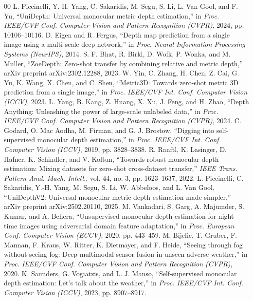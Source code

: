 \documentclass[conference]{IEEEtran}
\begin{document}
\begin{thebibliography}{00}
 L. Piccinelli, Y.-H. Yang, C. Sakaridis, M. Segu, S. Li, L. Van Gool, and F. Yu, ``UniDepth: Universal monocular metric depth estimation,'' in \emph{Proc. IEEE/CVF Conf. Computer Vision and Pattern Recognition (CVPR)}, 2024, pp. 10106--10116.
 D. Eigen and R. Fergus, ``Depth map prediction from a single image using a multi-scale deep network,'' in \emph{Proc. Neural Information Processing Systems (NeurIPS)}, 2014.
 S. F. Bhat, R. Birkl, D. Wofk, P. Wonka, and M. Muller, ``ZoeDepth: Zero-shot transfer by combining relative and metric depth,'' arXiv preprint arXiv:2302.12288, 2023.
 W. Yin, C. Zhang, H. Chen, Z. Cai, G. Yu, K. Wang, X. Chen, and C. Shen, ``Metric3D: Towards zero-shot metric 3D prediction from a single image,'' in \emph{Proc. IEEE/CVF Int. Conf. Computer Vision (ICCV)}, 2023.
 L. Yang, B. Kang, Z. Huang, X. Xu, J. Feng, and H. Zhao, ``Depth Anything: Unleashing the power of large-scale unlabeled data,'' in \emph{Proc. IEEE/CVF Conf. Computer Vision and Pattern Recognition (CVPR)}, 2024.
 C. Godard, O. Mac Aodha, M. Firman, and G. J. Brostow, ``Digging into self-supervised monocular depth estimation,'' in \emph{Proc. IEEE/CVF Int. Conf. Computer Vision (ICCV)}, 2019, pp. 3828--3838.
 R. Ranftl, K. Lasinger, D. Hafner, K. Schindler, and V. Koltun, ``Towards robust monocular depth estimation: Mixing datasets for zero-shot cross-dataset transfer,'' \emph{IEEE Trans. Pattern Anal. Mach. Intell.}, vol. 44, no. 3, pp. 1623--1637, 2022.
 L. Piccinelli, C. Sakaridis, Y.-H. Yang, M. Segu, S. Li, W. Abbeloos, and L. Van Gool, ``UniDepthV2: Universal monocular metric depth estimation made simpler,'' arXiv preprint arXiv:2502.20110, 2025.
 M. Vankadari, S. Garg, A. Majumder, S. Kumar, and A. Behera, ``Unsupervised monocular depth estimation for night-time images using adversarial domain feature adaptation,'' in \emph{Proc. European Conf. Computer Vision (ECCV)}, 2020, pp. 443--459.
 M. Bijelic, T. Gruber, F. Mannan, F. Kraus, W. Ritter, K. Dietmayer, and F. Heide, ``Seeing through fog without seeing fog: Deep multimodal sensor fusion in unseen adverse weather,'' in \emph{Proc. IEEE/CVF Conf. Computer Vision and Pattern Recognition (CVPR)}, 2020.
 K. Saunders, G. Vogiatzis, and L. J. Manso, ``Self-supervised monocular depth estimation: Let's talk about the weather,'' in \emph{Proc. IEEE/CVF Int. Conf. Computer Vision (ICCV)}, 2023, pp. 8907--8917.

\end{thebibliography}
\end{document}
